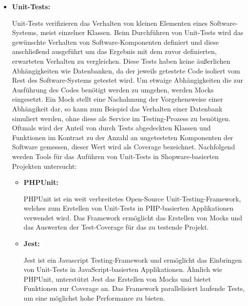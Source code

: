 \begin{itemize}
    \item {
        \textbf{Unit-Tests:}\par
        Unit-Tests verifizieren das Verhalten von kleinen Elementen eines Software-Systems, meist einzelner Klassen.
        Beim Durchführen von Unit-Tests wird das gewünschte Verhalten von Software-Komponenten definiert und
        diese anschließend ausgeführt um das Ergebnis mit dem zuvor definierten, erwarteten Verhalten zu vergleichen.
        Diese Tests haben keine äußerlichen Abhängigkeiten wie Datenbanken, da der jeweils getestete Code isoliert
        vom Rest des Software-Systems getestet wird.
        Um etwaige Abhängigkeiten die zur Ausführung des Codes benötigt werden zu umgehen, werden Mocks eingesetzt.
        Ein Mock stellt eine Nachahmung der Vorgehensweise einer Abhängikeit dar, so kann zum Beispiel das Verhalten
        einer Datenbank simuliert werden, ohne diese als Service im Testing-Prozess zu benötigen.
        Oftmals wird der Anteil von durch Tests abgedeckten Klassen und Funktionen im Kontrast zu der Anzahl an
        ungetesteten Komponenten der Software gemessen, dieser Wert wird als Coverage bezeichnet.
        Nachfolgend werden Tools für das Auführen von Unit-Tests in Shopware-basierten Projekten untersucht:

        \begin{itemize}
            \item {
                \textbf{PHPUnit:}\par
                PHPUnit ist ein weit verbreitetes Open-Source Unit-Testing-Framework, welches zum Erstellen von
                Unit-Tests in PHP-basierten Applikationen verwendet wird.
                Das Framework ermöglicht das Erstellen von Mocks und das Auswerten der Test-Coverage für das zu
                testende Projekt.
            }

            \item {
                \textbf{Jest:}\par
                Jest ist ein Javascript Testing-Framework und ermöglicht das Einbringen von Unit-Tests in
                JavaScript-basierten Applikationen.
                Ähnlich wie PHPUnit, unterstützt Jest das Erstellen von Mocks und bietet Funktionen zur Coverage an.
                Das Framework parallelisiert laufende Tests, um eine möglichst hohe Performance zu bieten.
            }
        \end{itemize}
    }


\end{itemize}
